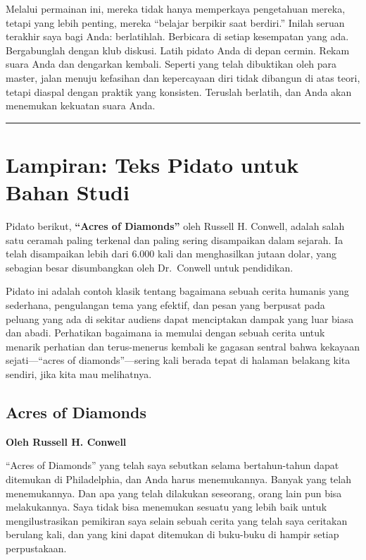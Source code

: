 \documentclass[
  letterpaper,
  DIV=11,
  numbers=noendperiod]{scrreprt}
\begin{document}
Melalui permainan ini, mereka tidak hanya memperkaya pengetahuan mereka,
tetapi yang lebih penting, mereka ``belajar berpikir saat berdiri.''
Inilah seruan terakhir saya bagi Anda: berlatihlah. Berbicara di setiap
kesempatan yang ada. Bergabunglah dengan klub diskusi. Latih pidato Anda
di depan cermin. Rekam suara Anda dan dengarkan kembali. Seperti yang
telah dibuktikan oleh para master, jalan menuju kefasihan dan
kepercayaan diri tidak dibangun di atas teori, tetapi diaspal dengan
praktik yang konsisten. Teruslah berlatih, dan Anda akan menemukan
kekuatan suara Anda.

\begin{center}\rule{0.5\linewidth}{0.5pt}\end{center}


\chapter{Lampiran: Teks Pidato untuk Bahan
Studi}\label{lampiran-teks-pidato-untuk-bahan-studi}

Pidato berikut, \textbf{``Acres of Diamonds''} oleh Russell H. Conwell,
adalah salah satu ceramah paling terkenal dan paling sering disampaikan
dalam sejarah. Ia telah disampaikan lebih dari 6.000 kali dan
menghasilkan jutaan dolar, yang sebagian besar disumbangkan oleh
Dr.~Conwell untuk pendidikan.

Pidato ini adalah contoh klasik tentang bagaimana sebuah cerita humanis
yang sederhana, pengulangan tema yang efektif, dan pesan yang berpusat
pada peluang yang ada di sekitar audiens dapat menciptakan dampak yang
luar biasa dan abadi. Perhatikan bagaimana ia memulai dengan sebuah
cerita untuk menarik perhatian dan terus-menerus kembali ke gagasan
sentral bahwa kekayaan sejati---``acres of diamonds''---sering kali
berada tepat di halaman belakang kita sendiri, jika kita mau melihatnya.

\section{\texorpdfstring{\textbf{Acres of
Diamonds}}{Acres of Diamonds}}\label{acres-of-diamonds}

\textbf{Oleh Russell H. Conwell}

``Acres of Diamonds'' yang telah saya sebutkan selama bertahun-tahun
dapat ditemukan di Philadelphia, dan Anda harus menemukannya. Banyak
yang telah menemukannya. Dan apa yang telah dilakukan seseorang, orang
lain pun bisa melakukannya. Saya tidak bisa menemukan sesuatu yang lebih
baik untuk mengilustrasikan pemikiran saya selain sebuah cerita yang
telah saya ceritakan berulang kali, dan yang kini dapat ditemukan di
buku-buku di hampir setiap perpustakaan.
\end{document}
